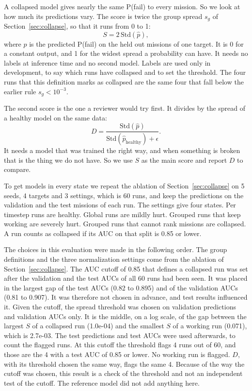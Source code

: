 \documentclass{IEEEtaes}
\begin{document}
A collapsed model gives nearly the same P(fail) to every mission. So we look at how much its predictions vary. The score is twice the group spread $s_g$ of Section~\ref{sec:collapse}, so that it runs from 0 to 1:
\begin{equation}
S = 2\,\mathrm{Std}(\hat{p}),
\end{equation}
where $\hat{p}$ is the predicted P(fail) on the held out missions of one target. It is 0 for a constant output, and 1 for the widest spread a probability can have. It needs no labels at inference time and no second model. Labels are used only in development, to say which runs have collapsed and to set the threshold. The four runs that this definition marks as collapsed are the same four that fall below the earlier rule $s_g<10^{-3}$.

The second score is the one a reviewer would try first. It divides by the spread of a healthy model on the same data:
\begin{equation}
D = \frac{\mathrm{Std}(\hat{p})}{\mathrm{Std}(\hat{p}_{\mathrm{healthy}}) + \epsilon}.
\end{equation}
It needs a model that was trained the right way, and when something is broken that is the thing we do not have. So we use $S$ as the main score and report $D$ to compare.

To get models in every state we repeat the ablation of Section~\ref{sec:collapse} on 5 seeds, 4 targets and 3 settings, which is 60 runs, and keep the predictions on the validation and the test missions of each run. The settings give four states. Per timestep runs are healthy. Global runs are mildly hurt. Grouped runs that keep working are severely hurt. Grouped runs that cannot rank missions are collapsed. A run counts as collapsed if its AUC on that split is 0.85 or lower.

The choices in this evaluation were made in the following order. The group definitions and the three normalization settings come from the ablation of Section~\ref{sec:collapse}. The AUC cutoff of 0.85 that defines a collapsed run was set after the validation and the test AUCs of all 60 runs had been seen. It was placed in the largest gap of the test AUCs (0.82 to 0.895) and of the validation AUCs (0.81 to 0.907). It was therefore not chosen in advance, and test results influenced it. Given the cutoff, the spread threshold was chosen on validation predictions and validation AUCs only. It is the middle, on a log scale, of the gap between the largest $S$ of a collapsed run (1.0e-04) and the smallest $S$ of a working run (0.071), which is 2.7e-03. The test predictions and test AUCs were used afterwards, to count the flagged runs. At this cutoff the threshold flags 4 runs out of 60, and those are the 4 with a test AUC of 0.85 or lower. No working run is flagged. $D$, with its threshold chosen the same way, flags the same 4. Because of the way the cutoff was chosen, this result is a check of the threshold and not an independent test of the cutoff. The reference model did not add anything here.
\end{document}
